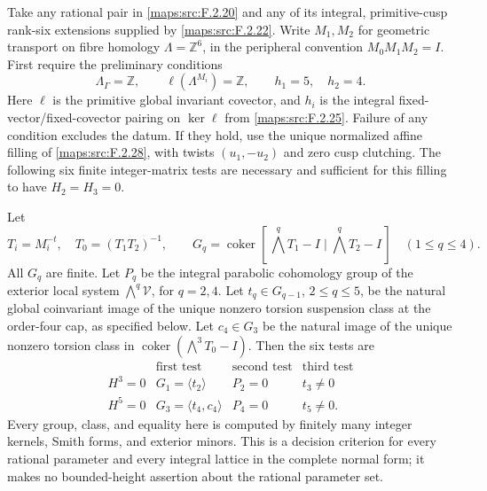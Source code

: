 \begin{theorem}\label{maps:src:F.2.29}


Take any rational pair in \ref{maps:src:F.2.20} and any of its integral,
primitive-cusp rank-six extensions supplied by \ref{maps:src:F.2.22}.
Write $M_1,M_2$ for geometric transport on fibre homology
$\Lambda=\mathbb Z^6$, in the peripheral convention
$M_0M_1M_2=I$.
First require the preliminary conditions
\[
 \Lambda_\Gamma=\mathbb Z,\qquad
 \ell(\Lambda^{M_i})=\mathbb Z,\qquad h_1=5,\quad h_2=4 .
 \tag{F.HC1}\label{maps:eq:F.HC1}
\]
Here $\ell$ is the primitive global invariant covector, and
$h_i$ is the integral fixed-vector/fixed-covector pairing
on $\ker\ell$ from \ref{maps:src:F.2.25}.
Failure of any condition excludes the datum.
If they hold, use the unique normalized affine filling of
\ref{maps:src:F.2.28}, with twists $(u_1,-u_2)$ and zero cusp clutching.
The following six finite integer-matrix tests are necessary
and sufficient for this filling to have $H_2=H_3=0$.

Let
\[
 T_i=M_i^{-t},\quad T_0=(T_1T_2)^{-1},\qquad
 G_q=\operatorname{coker}
 [\,\bigwedge^qT_1-I\mid\bigwedge^qT_2-I\,]
 \quad(1\le q\le4).
 \tag{F.HC2}\label{maps:eq:F.HC2}
\]
All $G_q$ are finite.  Let $P_q$ be the integral parabolic
cohomology group of the exterior local system
$\bigwedge^q\mathcal V$, for $q=2,4$.
Let $t_q\in G_{q-1}$, $2\le q\le5$, be the natural global
coinvariant image of the unique nonzero torsion suspension
class at the order-four cap, as specified below.
Let $c_4\in G_3$ be the natural image of the unique nonzero
torsion class in
$\operatorname{coker}(\bigwedge^3T_0-I)$.
Then the six tests are
\[
\begin{array}{c|ccc}
 &\text{first test}&\text{second test}&\text{third test}\\ \hline
 H^3=0&G_1=\langle t_2\rangle&P_2=0&t_3\ne0\\
 H^5=0&G_3=\langle t_4,c_4\rangle&P_4=0&t_5\ne0 .
\end{array}
\tag{F.HC3}\label{maps:eq:F.HC3}
\]
Every group, class, and equality here is computed by
finitely many integer kernels, Smith forms, and exterior
minors.  This is a decision criterion for every rational
parameter and every integral lattice in the complete
normal form; it makes no bounded-height assertion about
the rational parameter set.

\end{theorem}


